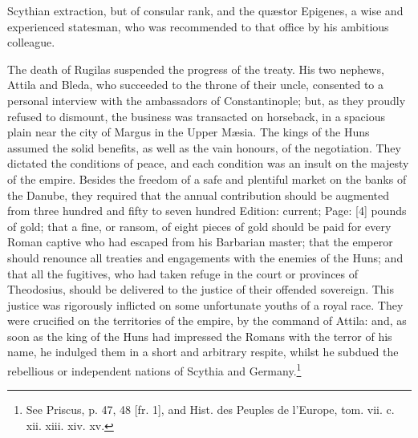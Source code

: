 Scythian extraction, but of consular rank, and the quæstor Epigenes, a wise and experienced statesman, who was recommended to that office by his ambitious colleague.

The death of Rugilas suspended the progress of the treaty. His two nephews, Attila and Bleda, who succeeded to the throne of their uncle, consented to a personal interview with the ambassadors of Constantinople; but, as they proudly refused to dismount, the business was transacted on horseback, in a spacious plain near the city of Margus in the Upper Mæsia. The kings of the Huns assumed the solid benefits, as well as the vain honours, of the negotiation. They dictated the conditions of peace, and each condition was an insult on the majesty of the empire. Besides the freedom of a safe and plentiful market on the banks of the Danube, they required that the annual contribution should be augmented from three hundred and fifty to seven hundred Edition: current; Page: [4] pounds of gold; that a fine, or ransom, of eight pieces of gold should be paid for every Roman captive who had escaped from his Barbarian master; that the emperor should renounce all treaties and engagements with the enemies of the Huns; and that all the fugitives, who had taken refuge in the court or provinces of Theodosius, should be delivered to the justice of their offended sovereign. This justice was rigorously inflicted on some unfortunate youths of a royal race. They were crucified on the territories of the empire, by the command of Attila: and, as soon as the king of the Huns had impressed the Romans with the terror of his name, he indulged them in a short and arbitrary respite, whilst he subdued the rebellious or independent nations of Scythia and Germany.\footnote{See Priscus, p. 47, 48 [fr. 1], and Hist. des Peuples de l\texthebrew{}’Europe, tom. vii. c. xii. xiii. xiv. xv.}

